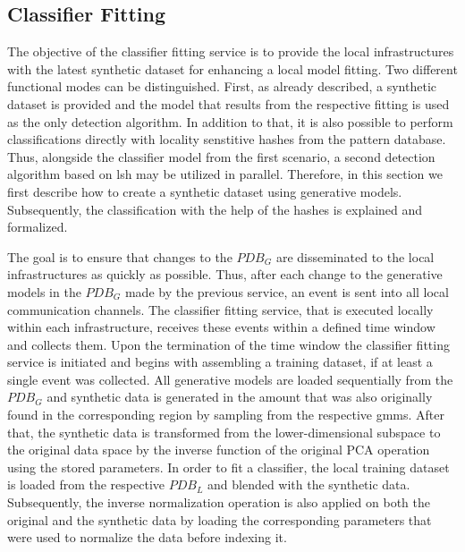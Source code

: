 \documentclass[../../main.tex]{subfiles}
\begin{document}
\subsection{Classifier Fitting} \label{subsec:classifier_fitting}

The objective of the classifier fitting service is to provide the local infrastructures with the latest synthetic dataset for enhancing a local model fitting. Two different functional modes can be distinguished. First, as already described, a synthetic dataset is provided and the model that results from the respective fitting is used as the only detection algorithm. In addition to that, it is also possible to perform classifications directly with locality senstitive hashes from the pattern database. Thus, alongside the classifier model from the first scenario, a second detection algorithm  based on \gls{lsh} may be utilized in parallel. Therefore, in this section we first describe how to create a synthetic dataset using generative models. Subsequently, the classification with the help of the hashes is explained and formalized.

The goal is to ensure that changes to the $PDB_G$ are disseminated to the local infrastructures as quickly as possible. Thus, after each change to the generative models in the $PDB_G$ made by the previous service, an event is sent into all local communication channels. The classifier fitting service, that is executed locally within each infrastructure, receives these events within a defined time window and collects them. Upon the termination of the time window the classifier fitting service is initiated and begins with assembling a training dataset, if at least a single event was collected. All generative models are loaded sequentially from the $PDB_G$ and synthetic data is generated in the amount that was also originally found in the corresponding region by sampling from the respective \glspl{gmm}. After that, the synthetic data is transformed from the lower-dimensional subspace to the original data space by the inverse function of the original PCA operation using the stored parameters. In order to fit a classifier, the local training dataset is loaded from the respective $PDB_L$ and blended with the synthetic data. Subsequently, the inverse normalization operation is also applied on both the original and the synthetic data by loading the corresponding parameters that were used to normalize the data before indexing it. 


 
\end{document}
